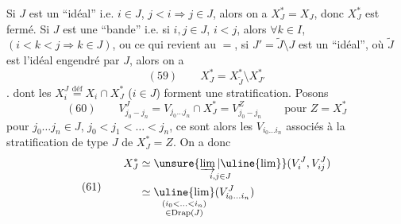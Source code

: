 Si $J$ est un ``idéal'' i.e. $i\in J$, $j<i\Longrightarrow j\in J$,
alors on a $X_J^*=X_J$, donc $X_J^*$ est fermé.
Si $J$ est une ``bande'' i.e. si $i,j\in J$, $i<j$,
alors $\forall k\in I$, $(i<k<j\Longrightarrow k\in J)$,
ou ce qui revient au $=$, si $J'=\widetilde J\setminus J$ est
un ``idéal'', où $\widetilde J$ est l'idéal engendré par $J$,
alors on a
\[
(59)\qquad X_J^*=X_{\widetilde J}^*\setminus X_{J'}^*
\]
.
dont les $X_i^J\overset{\mathrm{déf}}{=}X_i\cap X_J^*$ ($i\in J$)
forment une stratification. Posons
\[
(60)\qquad V_{j_0-j_n}^J
=V_{j_0\ldots j_n}\cap X_J^*=V_{j_0-j_n}^Z
\qquad\text{pour }Z=X_J^*
\]
pour $j_0\ldots j_n\in J$, $j_0<j_1<\ldots<j_n$,
ce sont alors les $V_{i_0\ldots i_n}$ associés à la stratification
de type $J$ de $X_J^*=Z$. On a donc
\[
(61)\qquad\begin{aligned}
X_J^*&\simeq\underset{i,j\in J}{\unsure{\varinjlim|\uline{\lim}}}
(V_i^J,V_{ij}^J)\\
&\simeq\underset{\substack{(i_0<\ldots<i_n)\\\in\operatorname{Drap}(J)}}{\uline{\lim}}
(V_{i_0\ldots i_n}^J)
\end{aligned}
\]
